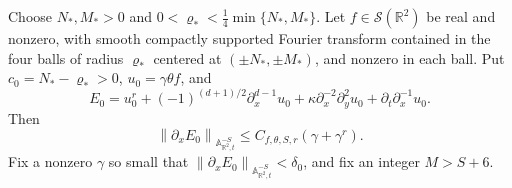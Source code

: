 \documentclass[12pt,reqno,letterpaper]{amsart}
\numberwithin{equation}{section}
\theoremstyle{definition}
\newcommand{\R}{\mathbb R}
\newcommand{\A}{\mathbb A}
\newcommand{\norm}[1]{\left\lVert #1\right\rVert}
\begin{document}
Choose $N_*,M_*>0$ and
$0<\varrho_*<\frac14\min\{N_*,M_*\}$.  Let
$f\in\mathcal S(\R^2)$ be real and nonzero, with smooth compactly
supported Fourier transform contained in the four balls of radius
$\varrho_*$ centered at $(\pm N_*,\pm M_*)$, and nonzero in each ball.
Put $c_0=N_*-\varrho_*>0$, $u_0=\gamma\theta f$, and
\begin{equation}\label{eq:Euclidean-induction-initial-pair}
 E_0=u_0^r+(-1)^{(d+1)/2}\partial_x^{d-1}u_0
 +\kappa\partial_x^{-2}\partial_y^2u_0
 +\partial_t\partial_x^{-1}u_0.
\end{equation}
Then
\begin{equation}\label{eq:Euclidean-induction-initial-error}
 \norm{\partial_xE_0}_{\A^{-S}_{\R^2,t}}
 \leq C_{f,\theta,S,r}(\gamma+\gamma^r).
\end{equation}
Fix a nonzero $\gamma$ so small that
$\norm{\partial_xE_0}_{\A^{-S}_{\R^2,t}}<\delta_0$, and fix an integer
$M>S+6$.
\end{document}
